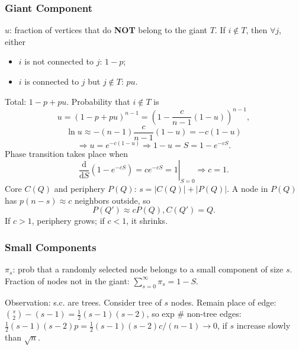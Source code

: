 \documentclass[a4paper,twocolumn,10pt]{article}
\newcommand{\pte}[1]{\left({#1}\right)}
\newcommand{\dd}{\mathrm{d}}
\begin{document}
	\subsubsection{Giant Component}
		$u$: fraction of vertices that do \textbf{NOT} belong to the giant $T$.
		If $i\notin T$, then $\forall j$, either
		\begin{itemize}
			\item $i$ is not connected to $j$: $1-p$;
			\item $i$ is connected to $j$ but $j\notin T$: $pu$.
		\end{itemize}
		Total: $1-p+pu$. Probability that $i\notin T$ is
		\[
			u=(1-p+pu)^{n-1}=\pte{1-\frac{c}{n-1}(1-u)}^{n-1},
		\]
		\[
			\ln u 
			\approx -(n-1) \frac{c}{n-1} (1-u) = -c(1-u)
		\]
		\[
			\Longrightarrow u=e^{-c(1-u)}
			\Longrightarrow 1-u=S=1-e^{-cS}.
		\]
		Phase transition takes place when
		\[
			\left.\frac{\dd}{\dd S} \pte{1-e^{-cS}} = c e^{-cS} = 1 \right|_{S=0}
			\Longrightarrow c=1.
		\]
		Core $C(Q)$ and periphery $P(Q)$: $s=|C(Q)|+|P(Q)|$.
		A node in $P(Q)$ has $p(n-s)\approx c$ neighbors outside, so
		\[
			P(Q') \approx c P(Q), C(Q') = Q.
		\]
		If $c>1$, periphery grows; if $c<1$, it shrinks.
	
	\subsubsection{Small Components}
		$\pi_s$: prob that a randomly selected node belongs to a small component of size $s$.
		Fraction of nodes not in the giant: $\sum_{s=0}^\infty \pi_s = 1-S$.

		Observation: s.c. are trees.
		Consider tree of $s$ nodes.
		Remain place of edge: $\binom s 2 - (s-1) = \frac 1 2 (s-1)(s-2)$,
			so exp $\#$ non-tree edges: $\frac 1 2 (s-1)(s-2) p =
			\frac 1 2 (s-1)(s-2) c / (n-1) \to 0$,
			if $s$ increase slowly than $\sqrt n$.
\end{document}
